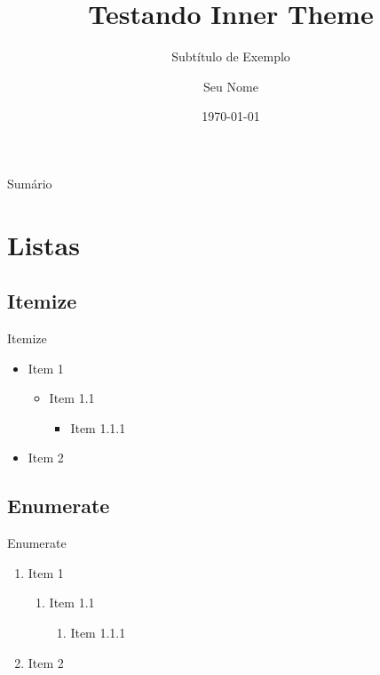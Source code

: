 \documentclass[aspectratio=169]{beamer}
\title{Testando Inner Theme}
\subtitle{Subtítulo de Exemplo}
\author{Seu Nome}
\institute{Sua Instituição}
\date{\today}
\begin{document}
\maketitle %

\begin{frame}{Sumário}

\tableofcontents
    
\end{frame}

\section{Listas}

\subsection{Itemize}
\begin{frame}{Itemize}
\begin{itemize}
    \item Item 1
    \begin{itemize}
        \item Item 1.1
        \begin{itemize}
            \item Item 1.1.1
        \end{itemize}
    \end{itemize}
    \item Item 2
\end{itemize}
\end{frame}

\subsection{Enumerate}
\begin{frame}{Enumerate}
\begin{enumerate}
    \item Item 1
    \begin{enumerate}
        \item Item 1.1
        \begin{enumerate}
            \item Item 1.1.1
        \end{enumerate}
    \end{enumerate}
    \item Item 2
\end{enumerate}
\end{frame}
\end{document}
